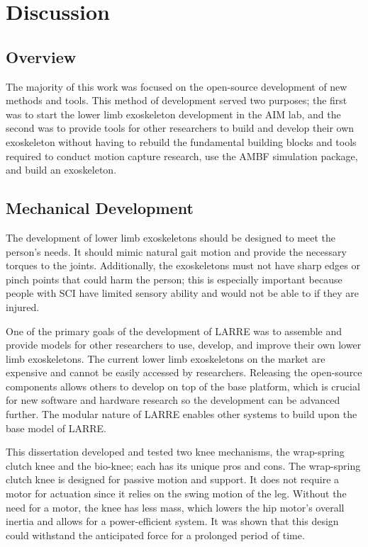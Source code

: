 \chapter{Discussion}

\section{Overview}

The majority of this work was focused on the open-source development of new methods and tools. This method of development served two purposes; the first was to start the lower limb exoskeleton development in the AIM lab, and the second was to provide tools for other researchers to build and develop their own exoskeleton without having to rebuild the fundamental building blocks and tools required to conduct motion capture research, use the AMBF simulation package, and build an exoskeleton. 


\section{Mechanical Development}

The development of lower limb exoskeletons should be designed to meet the person's needs. It should mimic natural gait motion and provide the necessary torques to the joints. Additionally, the exoskeletons must not have sharp edges or pinch points that could harm the person; this is especially important because people with SCI have limited sensory ability and would not be able to if they are injured. 

One of the primary goals of the development of LARRE was to assemble and provide models for other researchers to use, develop, and improve their own lower limb exoskeletons. The current lower limb exoskeletons on the market are expensive and cannot be easily accessed by researchers. Releasing the open-source components allows others to develop on top of the base platform, which is crucial for new software and hardware research so the development can be advanced further. The modular nature of LARRE enables other systems to build upon the base model of LARRE. 

This dissertation developed and tested two knee mechanisms, the wrap-spring clutch knee and the bio-knee; each has its unique pros and cons. The wrap-spring clutch knee is designed for passive motion and support. It does not require a motor for actuation since it relies on the swing motion of the leg. Without the need for a motor, the knee has less mass, which lowers the hip motor's overall inertia and allows for a power-efficient system. It was shown that this design could withstand the anticipated force for a prolonged period of time.   

